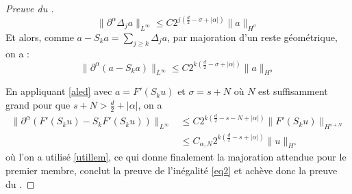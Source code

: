 \documentclass[11pt,a4paper]{article}
\begin{document}
\begin{proof}[Preuve du ]
\begin{equation*}
\|\partial^\alpha \Delta_j a\|_{L^\infty} \leq C 2^{j(\frac{d}{2}-\sigma+|\alpha|)} \|a\|_{H^\sigma}
\end{equation*}
Et alors, comme $a-S_ka=\sum_{j\geq k} \Delta_j a$, par majoration d'un reste géométrique, on a :
\begin{equation}\label{aled}
\|\partial^\alpha (a-S_k a)\|_{L^\infty} \leq C 2^{k(\frac{d}{2}-\sigma+|\alpha|)} \|a\|_{H^\sigma}
\end{equation}

En appliquant \eqref{aled} avec $a=F'(S_ku)$ et $\sigma = s + N$ où $N$ est suffisamment grand pour que $s+N > \frac{d}{2} + |\alpha|$, on a 
\begin{align*}
\|\partial^\alpha (F'(S_ku)-S_k F'(S_ku))\|_{L^\infty} &\leq C 2^{k(\frac{d}{2}-s-N+|\alpha|)} \|F'(S_ku)\|_{H^{s+N}} \\
& \leq  C_{\alpha,N} 2^{k(\frac{d}{2}-s+|\alpha|)} \|u\|_{H^s}
\end{align*}
où l'on a utilisé \eqref{utillem}, ce qui donne finalement la majoration attendue pour le premier membre, conclut la preuve de l'inégalité \eqref{eq2} et achève donc la preuve du .
\end{proof}



















\newpage
\printbibliography[heading=bibintoc, title={Références}]
\end{document}
